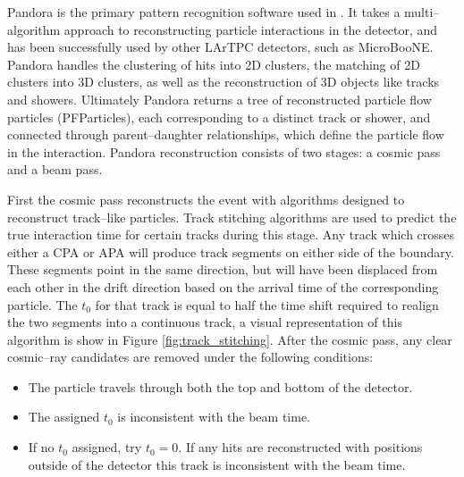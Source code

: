 Pandora\cite{Marshall2015} is the primary pattern recognition software used in
\protodune{}. It takes a multi--algorithm approach to reconstructing particle
interactions in the detector, and has been successfully used by other LArTPC
detectors, such as MicroBooNE\cite{Acciarri:2017hat}. Pandora handles the 
clustering of hits into 2D clusters, the matching of 2D clusters into 3D
clusters, as well as the reconstruction of 3D objects like tracks and 
showers. Ultimately Pandora returns a tree of reconstructed particle flow
particles (PFParticles), each corresponding to a distinct track or shower, and 
connected through parent--daughter relationships, which define the particle flow
in the interaction. Pandora reconstruction consists of two stages: a cosmic 
pass and a beam pass. 


First the cosmic pass reconstructs the event with algorithms designed to 
reconstruct track--like particles. Track stitching algorithms are used to
predict the true interaction time for certain tracks during this stage. Any 
track which crosses either a CPA or APA will produce track segments on either 
side of the boundary. These segments point in the same direction, but will 
have been displaced from each other in the drift direction based on the 
arrival time of the corresponding particle. The $t_0$ for that track is equal 
to half the time shift required to realign the two segments into a continuous 
track, a visual representation of this algorithm is show in Figure 
\ref{fig:track_stitching}.  After the cosmic pass, any clear cosmic--ray 
candidates are removed under the following conditions\cite{protoduneperf}:
\begin{itemize}
	\item The particle travels through both the top and bottom of the detector.
	\item The assigned $t_0$ is inconsistent with the beam time.
	\item If no $t_0$ assigned, try $t_0 = 0$. If any hits are reconstructed 
		with positions outside of the detector this track is inconsistent with the 
		beam time.
\end{itemize}

